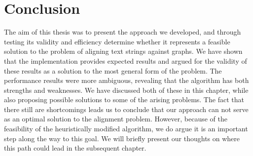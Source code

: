 \documentclass[thesis.tex]{subfiles}
\begin{document}
\section{Conclusion}
The aim of this thesis was to present the approach we developed, and through testing its validity and efficiency determine whether it represents a feasible solution to the problem of aligning text strings against graphs. We have shown that the implementation provides expected results and argued for the validity of these results as a solution to the most general form of the problem. The performance results were more ambiguous, revealing that the algorithm has both strengths and weaknesses. We have discussed both of these in this chapter, while also proposing possible solutions to some of the arising problems. The fact that there still are shortcomings leads us to conclude that our approach can not serve as an optimal solution to the alignment problem. However, because of the feasibility of the heuristically modified algorithm, we do argue it is an important step along the way to this goal. We will briefly present our thoughts on where this path could lead in the subsequent chapter.
\end{document}

